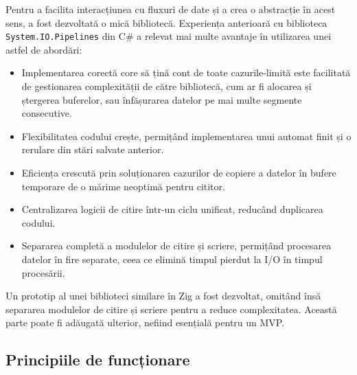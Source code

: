 \documentclass[a4paper,12pt]{report}
\begin{document}
Pentru a facilita interacțiunea cu fluxuri de date și a crea o abstracție în acest sens,
a fost dezvoltată o mică bibliotecă.
Experiența anterioară cu biblioteca \texttt{System.IO.Pipelines}\cite{system_io_pipelines}
din C\# a relevat mai multe avantaje în utilizarea unei astfel de abordări:
\begin{itemize}
  \item
  Implementarea corectă core să țină cont de toate cazurile-limită
  este facilitată de gestionarea complexității de către
  bibliotecă, cum ar fi alocarea și ștergerea buferelor,
  sau înfășurarea datelor pe mai multe segmente consecutive.

  \item
  Flexibilitatea codului crește, permițând implementarea unui automat finit
  și o rerulare din stări salvate anterior.

  \item
  Eficiența crescută prin soluționarea cazurilor de copiere a datelor în bufere temporare
  de o mărime neoptimă pentru cititor.

  \item
  Centralizarea logicii de citire într-un ciclu unificat,
  reducând duplicarea codului.

  \item
  Separarea completă a modulelor de citire și scriere,
  permițând procesarea datelor în fire separate,
  ceea ce elimină timpul pierdut la \ac{I/O} în timpul procesării.
\end{itemize}

Un prototip al unei biblioteci similare în Zig a fost dezvoltat,
omitând însă separarea modulelor de citire și scriere pentru a reduce complexitatea.
Această parte poate fi adăugată ulterior, nefiind esențială pentru un \ac{MVP}.

\subsection{Principiile de funcționare}
\end{document}
